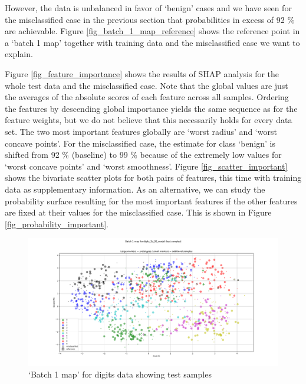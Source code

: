 However, the data is unbalanced in favor of `benign' cases and we have seen for the misclassified case in the previous section that probabilities in excess of 92 \% are achievable.
Figure \ref{fig_batch_1_map_reference} shows the reference point in a `batch 1 map' together with training data and the misclassified case we want to explain.\par
%
Figure \ref{fig_feature_importance} shows the results of SHAP analysis for the whole test data and the misclassified case.
Note that the global values are just the averages of the absolute scores of each feature across all samples.
Ordering the features by descending global importance yields the same sequence as for the feature weights, but we do not believe that this necessarily holds for every data set.
The two most important features globally are `worst radius' and `worst concave points'.
For the misclassified case, the estimate for class `benign' is shifted from 92 \% (baseline) to 99 \% because of the extremely low values for `worst concave points' and `worst smoothness'.
Figure \ref{fig_scatter_important} shows the bivariate scatter plots for both pairs of features, this time with training data as supplementary information.
As an alternative, we can study the probability surface resulting for the most important features if the other features are fixed at their values for the misclassified case.
This is shown in Figure \ref{fig_probability_important}.\par
%
\begin{figure}
\caption{`Batch 1 map' for digits data showing test samples}
\label{fig_batch_1_map_test_digits}
%
\begin{center}
\includegraphics[width=0.9\textheight, angle=90, trim={1.5cm 1.5cm 1.5cm 0.5cm}, clip]{figures/digits_batch_1_map.pdf}
\end{center}
\end{figure}
%
